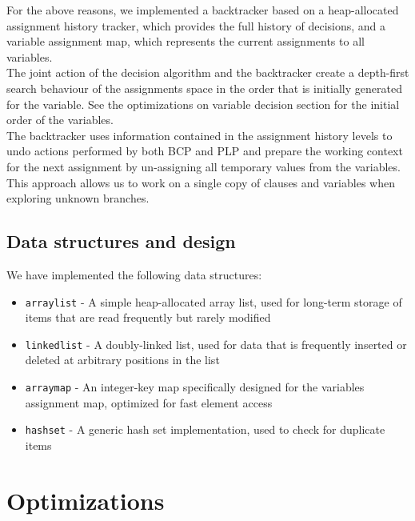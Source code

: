\documentclass[a4paper]{article}
\begin{document}
For the above reasons, we implemented a backtracker based on a heap-allocated assignment history tracker, which provides the full history of decisions, and a variable assignment map, which represents the current assignments to all variables.\\

The joint action of the decision algorithm and the backtracker create a depth-first search behaviour of the assignments space in the order that is initially generated for the variable. See the optimizations on variable decision section for the initial order of the variables.\\

The backtracker uses information contained in the assignment history levels to undo actions performed by both BCP and PLP and prepare the working context for the next assignment by un-assigning all temporary values from the variables. This approach allows us to work on a single copy of clauses and variables when exploring unknown branches.\\

\subsection{Data structures and design}

We have implemented the following data structures:

\begin{itemize}

\item \texttt{arraylist} - A simple heap-allocated array list, used for long-term storage of items that are read frequently but rarely modified

\item \texttt{linkedlist} - A doubly-linked list, used for data that is frequently inserted or deleted at arbitrary positions in the list

\item \texttt{arraymap} - An integer-key map specifically designed for the variables assignment map, optimized for fast element access

\item \texttt{hashset} - A generic hash set implementation, used to check for duplicate items

\end{itemize}

\section{Optimizations}
\end{document}
